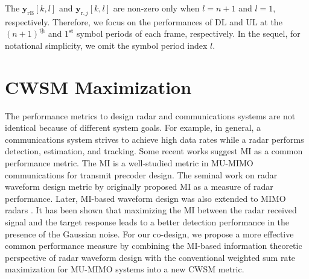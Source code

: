 \documentclass[10pt,journal]{IEEEtran}
\newcommand{\paren}[1]{\left({#1}\right)}
\newcommand{\bracket}[1]{{\left [{#1}\right ]}}
\newcommand{\ith}[1]    {{#1}^{\underline{\text{th}}}}
\newcommand{\rr}{_\mathrm{r}}
\newcommand{\rnr}{_{\mathrm{r},n_\mathrm{r}}}
\theoremstyle{definition}
\begin{document}
The $\mathbf{y}_{\mathrm{rB}}\bracket{k,l}$ and $\mathbf{y}_{\mathrm{r},j}\bracket{k,l}$ are non-zero only
when $l=n+1$ and $l=1$, respectively. Therefore, we focus on the performances of DL and UL at the $\ith{\paren{n+1}}$ and $1^{\textrm{st}}$ symbol periods of each frame, respectively. In the sequel, for notational simplicity, we omit the symbol period index $l$.
\section{CWSM Maximization}
\label{sec: formulation}
The performance metrics to design radar and communications systems are not identical because of different system goals. For example, in general, a communications system strives to achieve high data rates while a radar performs detection, estimation, and tracking. Some recent works \cite{alaee2020information,dokhanchi2020multi} suggest MI as a common performance metric. The MI is a well-studied metric in MU-MIMO communications for transmit precoder design\cite{Luo2011IterativeWMMSE}. The seminal work on radar waveform design metric by \cite{Bellinformation} originally proposed MI as a measure of radar performance. Later, MI-based waveform design was also extended to MIMO radars \cite{Jammer_game,NaghshTSP2017}. It has been shown \cite{Jammer_game} that maximizing the MI between the radar received signal and the target response leads to a better detection performance in the presence of the Gaussian noise. For our co-design, we propose a more effective common performance measure by combining the MI-based information theoretic perspective of radar waveform design with the conventional weighted sum rate maximization for MU-MIMO systems into a new CWSM metric.
	
\end{document}
